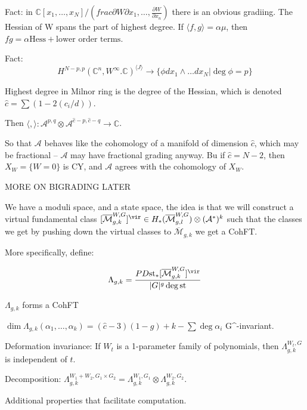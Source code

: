 \documentclass{amsart}
\theoremstyle{definition}
\newcommand{\Mbar}{\overline{\mathcal{M}}}
\newcommand{\C}{\mathbb{C}}
\newcommand{\st}{\text{st}}
\begin{document}
Fact: in $\C[x_1,\dots,x_N]/(frac{\partial W}{\partial x_1},\dots,\frac{\partial W}{\partial x_n})$ there is an obvious gradiing.  The Hessian of W spans the part of highest degree.  If $\langle f,g\rangle=\alpha\mu$, then $fg=\alpha \text{Hess}+\text{lower order terms}$.


Fact: $$H^{N-p,p}(\C^n,W^\infty. \C)^{\langle J\rangle}\to\{\phi dx_1\wedge\dots dx_N|\deg \phi=p\}$$

Highest degree in Milnor ring is the degree of the Hessian, which is denoted $\hat{c}=\sum (1-2(c_i/d))$.

Then $\langle,\rangle:\mathcal{A}^{p,q}\otimes\mathcal{A}^{\hat{c}-p,\hat{c}-q}\to\C$.

So that $\mathcal{A}$ behaves like the cohomology of a manifold of dimension $\hat{c}$, which may be fractional -- $\mathcal{A}$ may have fractional grading anyway.  Bu
 if $\hat{c}=N-2$, then $X_W=\{W=0\}$ is CY, and $\mathcal{A}$ agrees with the cohomology of $X_W$.

MORE ON BIGRADING LATER

We have a moduli space, and a state space, the idea is that we will construct a virtual fundamental class $[\Mbar_{g,k}^{W,G}]^\vir\in H_*(\Mbar^{W,G}_{g,l})\otimes (\mathcal{A}^*)^k$ such that the classes we get by pushing down the virtual classes to $\Mbar_{g,k}$ we get a CohFT.

More specifically, define:

$$\Lambda_{g,k}=\frac{PD \st_*[\Mbar_{g,k}^{W,G}]^\vir}{|G|^g\deg\st}$$

$\Lambda_{g,k}$ forms a CohFT

$\dim \Lambda_{g,k} (\alpha_1,\dots,\alpha_k)=(\hat{c}-3)(1-g)+k-\sum\deg\alpha_i$
G^{}-invariant.

Deformation invariance: If $W_t$ is a 1-parameter family of polynomials, then $\Lambda_{g,k}^{W_t,G}$ is independent of $t$.

Decomposition: $\Lambda^{W_1+W_2,G_1\times G_2}_{g,k}=\Lambda^{W_1,G_1}_{g,k}\otimes\Lambda^{W_2,G_2}_{g,k}$.

Additional properties that facilitate computation.
\end{document}
